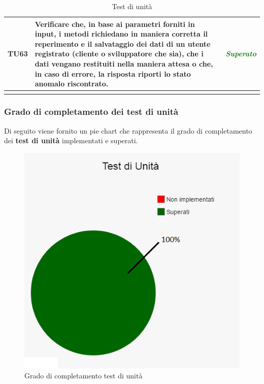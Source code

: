 \begin{longtable}{|>{\centering\arraybackslash}p{1.5cm}|>{\centering\arraybackslash}p{8cm} | >{\centering\arraybackslash}p{3.8cm}|}
		\hypertarget{TU63}{TU63} & Verificare che, in base ai parametri forniti in input, i metodi richiedano in maniera corretta il reperimento e il salvataggio dei dati di un utente registrato (cliente o sviluppatore che sia), che i dati vengano restituiti nella maniera attesa o che, in caso di errore, la risposta riporti lo stato anomalo riscontrato. & \textcolor{Green}{\textit{Superato}}\\ \hline

		\caption[Test di unità]{Test di unità}
		\label{tabella:test0}
	\end{longtable}

	\subsubsection{Grado di completamento dei test di unità}
	Di seguito viene fornito un pie chart che rappresenta il grado di completamento dei \textbf{test di unità} implementati e superati.
	\begin{figure}[H]
		\centering
		\includegraphics[scale=0.7]{includes/img/test_unita.png}
		\caption{Grado di completamento test di unità}
	\end{figure}
	
	\clearpage
	
